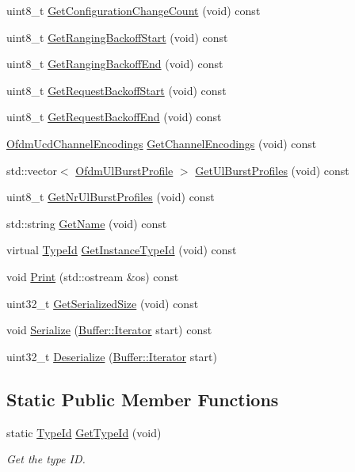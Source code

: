 \begin{DoxyCompactItemize}
\item 
uint8\+\_\+t \hyperlink{classns3_1_1Ucd_a529cdb2f246cd2e61f930f4f5e6d6856}{Get\+Configuration\+Change\+Count} (void) const 
\item 
uint8\+\_\+t \hyperlink{classns3_1_1Ucd_a8d4efa19133d83222d1777503dd330a4}{Get\+Ranging\+Backoff\+Start} (void) const 
\item 
uint8\+\_\+t \hyperlink{classns3_1_1Ucd_a1298bd905c683e86e9ef883ac394d939}{Get\+Ranging\+Backoff\+End} (void) const 
\item 
uint8\+\_\+t \hyperlink{classns3_1_1Ucd_a18ca64de0edced0eca83b912c5ccddff}{Get\+Request\+Backoff\+Start} (void) const 
\item 
uint8\+\_\+t \hyperlink{classns3_1_1Ucd_a726665c4c60bc1cadd2c78f97e543bdd}{Get\+Request\+Backoff\+End} (void) const 
\item 
\hyperlink{classns3_1_1OfdmUcdChannelEncodings}{Ofdm\+Ucd\+Channel\+Encodings} \hyperlink{classns3_1_1Ucd_a74f5caa2bb047b8994fa04b15ea6efc9}{Get\+Channel\+Encodings} (void) const 
\item 
std\+::vector$<$ \hyperlink{classns3_1_1OfdmUlBurstProfile}{Ofdm\+Ul\+Burst\+Profile} $>$ \hyperlink{classns3_1_1Ucd_adbe134cc68153c0a635d9a30bb53c226}{Get\+Ul\+Burst\+Profiles} (void) const 
\item 
uint8\+\_\+t \hyperlink{classns3_1_1Ucd_aec71f9690c6a7f1a4ec93ef56bf4745b}{Get\+Nr\+Ul\+Burst\+Profiles} (void) const 
\item 
std\+::string \hyperlink{classns3_1_1Ucd_a8230a9d37f8a8eb5245ab5590f0520de}{Get\+Name} (void) const 
\item 
virtual \hyperlink{classns3_1_1TypeId}{Type\+Id} \hyperlink{classns3_1_1Ucd_a7092e899322d173dfaf39776996fb99a}{Get\+Instance\+Type\+Id} (void) const 
\item 
void \hyperlink{classns3_1_1Ucd_ada4d6c794906854dff2936a645ecd4aa}{Print} (std\+::ostream \&os) const 
\item 
uint32\+\_\+t \hyperlink{classns3_1_1Ucd_aec3f0aa1bc45ff037bfa317210dad5e1}{Get\+Serialized\+Size} (void) const 
\item 
void \hyperlink{classns3_1_1Ucd_abcea8a06f3d7e07c21cb12b12ce36800}{Serialize} (\hyperlink{classns3_1_1Buffer_1_1Iterator}{Buffer\+::\+Iterator} start) const 
\item 
uint32\+\_\+t \hyperlink{classns3_1_1Ucd_ada667d90122da786f3fce88f226c35e3}{Deserialize} (\hyperlink{classns3_1_1Buffer_1_1Iterator}{Buffer\+::\+Iterator} start)
\end{DoxyCompactItemize}
\subsection*{Static Public Member Functions}
\begin{DoxyCompactItemize}
\item 
static \hyperlink{classns3_1_1TypeId}{Type\+Id} \hyperlink{classns3_1_1Ucd_affb7bd3cfc242e33e73acb778d0e2ce9}{Get\+Type\+Id} (void)
\begin{DoxyCompactList}\small\item\em Get the type ID. \end{DoxyCompactList}\end{DoxyCompactItemize}

